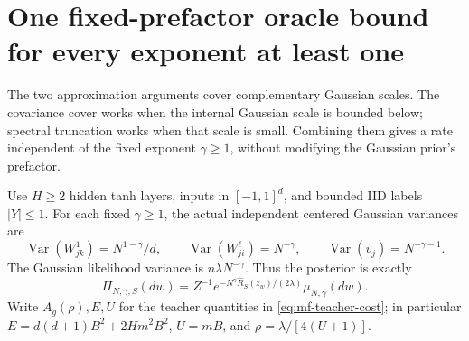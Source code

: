 \section{One fixed-prefactor oracle bound for every exponent at least one}
\label{sec:fixed-all-gamma-raw}

The two approximation arguments cover complementary Gaussian scales.
The covariance cover works when the internal Gaussian scale is bounded
below; spectral truncation works when that scale is small.  Combining
them gives a rate independent of the fixed exponent $\gamma\geq1$,
without modifying the Gaussian prior's prefactor.

Use $H\geq2$ hidden tanh layers, inputs in $[-1,1]^d$, and bounded
IID labels $|Y|\leq1$.  For each fixed $\gamma\geq1$, the actual
independent centered Gaussian variances are
\[
 \operatorname{Var}(W^1_{jk})=N^{1-\gamma}/d,\qquad
 \operatorname{Var}(W^\ell_{ji})=N^{-\gamma},\qquad
 \operatorname{Var}(v_j)=N^{-\gamma-1}.
\]
The Gaussian likelihood variance is $n\lambda N^{-\gamma}$.
Thus the posterior is exactly
\[
 \Pi_{N,\gamma,S}(dw)=Z^{-1}
        e^{-N^\gamma\widehat R_S(z_w)/(2\lambda)}\mu_{N,\gamma}(dw).
\]
Write $A_g(\rho),E,U$ for the teacher quantities in
\eqref{eq:mf-teacher-cost}; in particular
$E=d(d+1)B^2+2Hm^2B^2$, $U=mB$, and
$\rho=\lambda/[4(U+1)]$.

